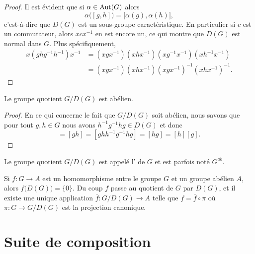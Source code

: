 \begin{proof}
    Il est évident que si \( \alpha\in\operatorname{Aut}(G)\) alors
    \begin{equation}
        \alpha\big( [g,h] \big)=\big[ \alpha(g),\alpha(h) \big],
    \end{equation}
    c'est-à-dire que \( D(G)\) est un sous-groupe caractéristique. En particulier si \( c\) est un commutateur, alors \( xcx^{-1}\) en est encore un, ce qui montre que \( D(G)\) est normal dans \( G\). Plus spécifiquement,
    \begin{subequations}
        \begin{align}
        x(ghg^{-1}h^{-1})x^{-1}&=(xgx^{-1})(xhx^{-1})(xg^{-1}x^{-1})(xh^{-1}x^{-1})\\
        &=(xgx^{-1})(xhx^{-1})(xgx^{-1})^{-1}(xhx^{-1})^{-1}.
        \end{align}
    \end{subequations}
\end{proof}

\begin{proposition}\label{PropAPRGooHBkELf}
    Le groupe quotient \( G/D(G)\) est abélien.
\end{proposition}

\begin{proof}
    En ce qui concerne le fait que \( G/D(G)\) soit abélien, nous savons que pour tout \( g,h\in G\) nous avons \( h^{-1}g^{-1}hg\in D(G)\) et donc
    \begin{equation}
        [g][h]=[gh]=[ghh^{-1}g^{-1}hg]=[hg]=[h][g].
    \end{equation}
\end{proof}

Le groupe quotient \( G/D(G)\) est appelé l' de \( G\) et est parfois noté \( G^{ab}\).

Si \( f\colon G\to A\) est un homomorphisme entre le groupe \( G\) et un groupe abélien \( A\), alors \( f\big( D(G) \big)=\{ 0 \}\). Du coup \( f\) passe au quotient de \( G\) par \( D(G)\), et il existe une unique application \( \bar f\colon G/D(G)\to A\) telle que \( f=\bar f\circ \pi\) où \( \pi\colon G\to G/D(G)\) est la projection canonique.



\section{Suite de composition}

